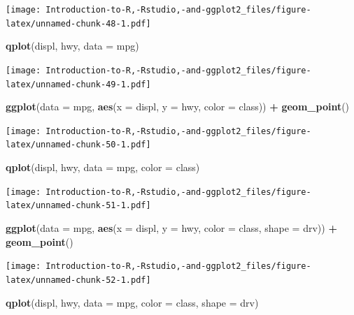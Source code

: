 \documentclass[]{book}
\newenvironment{Shaded}{\begin{snugshade}}{\end{snugshade}}
\newcommand{\DataTypeTok}[1]{\textcolor[rgb]{0.13,0.29,0.53}{#1}}
\newcommand{\KeywordTok}[1]{\textcolor[rgb]{0.13,0.29,0.53}{\textbf{#1}}}
\newcommand{\NormalTok}[1]{#1}
\newcommand{\OperatorTok}[1]{\textcolor[rgb]{0.81,0.36,0.00}{\textbf{#1}}}
\newcommand{\StringTok}[1]{\textcolor[rgb]{0.31,0.60,0.02}{#1}}
\begin{document}
\texttt{[image: Introduction-to-R,-Rstudio,-and-ggplot2\_files/figure-latex/unnamed-chunk-48-1.pdf]}

\begin{Shaded}
\begin{Highlighting}[]
\KeywordTok{qplot}\NormalTok{(displ, hwy, }\DataTypeTok{data =}\NormalTok{ mpg)}
\end{Highlighting}
\end{Shaded}

\texttt{[image: Introduction-to-R,-Rstudio,-and-ggplot2\_files/figure-latex/unnamed-chunk-49-1.pdf]}

\begin{Shaded}
\begin{Highlighting}[]
\KeywordTok{ggplot}\NormalTok{(}\DataTypeTok{data =}\NormalTok{ mpg, }\KeywordTok{aes}\NormalTok{(}\DataTypeTok{x =}\NormalTok{ displ, }\DataTypeTok{y =}\NormalTok{ hwy, }\DataTypeTok{color =}\NormalTok{ class)) }\OperatorTok{+}\StringTok{ }\KeywordTok{geom_point}\NormalTok{()}
\end{Highlighting}
\end{Shaded}

\texttt{[image: Introduction-to-R,-Rstudio,-and-ggplot2\_files/figure-latex/unnamed-chunk-50-1.pdf]}

\begin{Shaded}
\begin{Highlighting}[]
\KeywordTok{qplot}\NormalTok{(displ, hwy, }\DataTypeTok{data =}\NormalTok{ mpg, }\DataTypeTok{color =}\NormalTok{ class)}
\end{Highlighting}
\end{Shaded}

\texttt{[image: Introduction-to-R,-Rstudio,-and-ggplot2\_files/figure-latex/unnamed-chunk-51-1.pdf]}

\begin{Shaded}
\begin{Highlighting}[]
\KeywordTok{ggplot}\NormalTok{(}\DataTypeTok{data =}\NormalTok{ mpg, }\KeywordTok{aes}\NormalTok{(}\DataTypeTok{x =}\NormalTok{ displ, }\DataTypeTok{y =}\NormalTok{ hwy, }\DataTypeTok{color =}\NormalTok{ class, }\DataTypeTok{shape =}\NormalTok{ drv)) }\OperatorTok{+}\StringTok{ }\KeywordTok{geom_point}\NormalTok{()}
\end{Highlighting}
\end{Shaded}

\texttt{[image: Introduction-to-R,-Rstudio,-and-ggplot2\_files/figure-latex/unnamed-chunk-52-1.pdf]}

\begin{Shaded}
\begin{Highlighting}[]
\KeywordTok{qplot}\NormalTok{(displ, hwy, }\DataTypeTok{data =}\NormalTok{ mpg, }\DataTypeTok{color =}\NormalTok{ class, }\DataTypeTok{shape =}\NormalTok{ drv)}
\end{Highlighting}
\end{Shaded}
\end{document}
